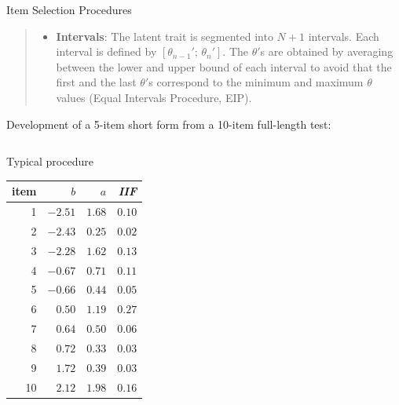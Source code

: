 \documentclass[final,t]{beamer}
\begin{document}
\begin{frame}
\begin{columns}[t]
\begin{column}{.45\linewidth}
\begin{block}{\centering Item Selection Procedures}
\begin{quote}
\begin{itemize}
					 			\item \textbf{Intervals}: The latent trait is segmented into $N + 1$ intervals. Each interval is defined by $[\theta_{n-1}'; \, \theta_n']$. 
					 			The $\theta'$s are obtained by averaging between the lower and upper bound of each interval
					 			to avoid that the first and the last $\theta'$s correspond to the minimum and maximum $\theta$ values (Equal Intervals Procedure, EIP).
					 		\end{itemize}
					 	\end{quote}
		
					 
					Development of a 5-item short form from a 10-item full-length test: 
					\begin{columns}
						\begin{column}{.50\linewidth}
								\centering 
								Typical procedure
						\begin{table}[ht]
								\centering
								\begin{tabular}{rrrr}
									\hline
									item & $b$ & $a$ & \emph{IIF} \\ 
									\hline
							\rowcolor{template!20!}1	& $	-2.51	$ & $	1.68	$ & $	0.10	$ \\
							\rowcolor{template!20!}2	& $	-2.43	$ & $	0.25	$ & $	0.02	$ \\
							3	& $	-2.28	$ & $	1.62	$ & $	0.13	$ \\
							\rowcolor{template!20!}4	& $	-0.67	$ & $	0.71	$ & $	0.11	$ \\
							5	& $	-0.66	$ & $	0.44	$ & $	0.05	$ \\
							\rowcolor{template!20!}6	& $	0.50	$ & $	1.19	$ & $	0.27	$ \\
							7	& $	0.64	$ & $	0.50	$ & $	0.06	$ \\
						\rowcolor{template!20!}	8	& $	0.72	$ & $	0.33	$ & $	0.03	$ \\
							9	& $	1.72	$ & $	0.39	$ & $	0.03	$ \\
							10	& $	2.12	$ & $	1.98	$ & $	0.16	$ \\
							 
									\hline
								\end{tabular}
							\end{table}
						\end{column}
					

\end{columns}
\end{block}
\end{column}
\end{columns}
\end{frame}
\end{document}
